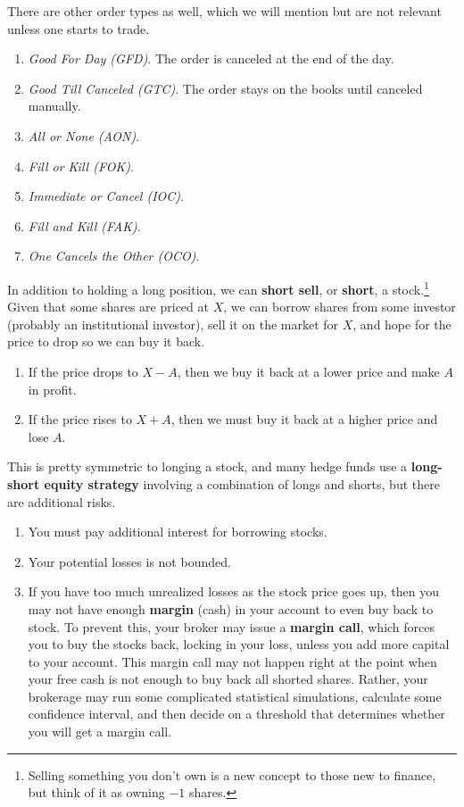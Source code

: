 \documentclass{article}
\begin{document}
    There are other order types as well, which we will mention but are not relevant unless one starts to trade. 
    \begin{enumerate}
      \item \textit{Good For Day (GFD)}. The order is canceled at the end of the day. 
      \item \textit{Good Till Canceled (GTC)}. The order stays on the books until canceled manually. 
      \item \textit{All or None (AON)}. 
      \item \textit{Fill or Kill (FOK)}.
      \item \textit{Immediate or Cancel (IOC)}. 
      \item \textit{Fill and Kill (FAK)}. 
      \item \textit{One Cancels the Other (OCO)}. 
    \end{enumerate}

    \begin{definition}
      In addition to holding a long position, we can \textbf{short sell}, or \textbf{short}, a stock.\footnote{Selling something you don't own is a new concept to those new to finance, but think of it as owning $-1$ shares. } Given that some shares are priced at $X$, we can borrow shares from some investor (probably an institutional investor), sell it on the market for $X$, and hope for the price to drop so we can buy it back. 
      \begin{enumerate}
        \item If the price drops to $X - A$, then we buy it back at a lower price and make $A$ in profit. 
        \item If the price rises to $X + A$, then we must buy it back at a higher price and lose $A$. 
      \end{enumerate}
    \end{definition}

    This is pretty symmetric to longing a stock, and many hedge funds use a \textbf{long-short equity strategy} involving a combination of longs and shorts, but there are additional risks. 
    \begin{enumerate}
      \item You must pay additional interest for borrowing stocks. 

      \item Your potential losses is not bounded. 

      \item If you have too much unrealized losses as the stock price goes up, then you may not have enough \textbf{margin} (cash) in your account to even buy back to stock. To prevent this, your broker may issue a \textbf{margin call}, which forces you to buy the stocks back, locking in your loss, unless you add more capital to your account. This margin call may not happen right at the point when your free cash is not enough to buy back all shorted shares. Rather, your brokerage may run some complicated statistical simulations, calculate some confidence interval, and then decide on a threshold that determines whether you will get a margin call. 
    \end{enumerate}
\end{document}
